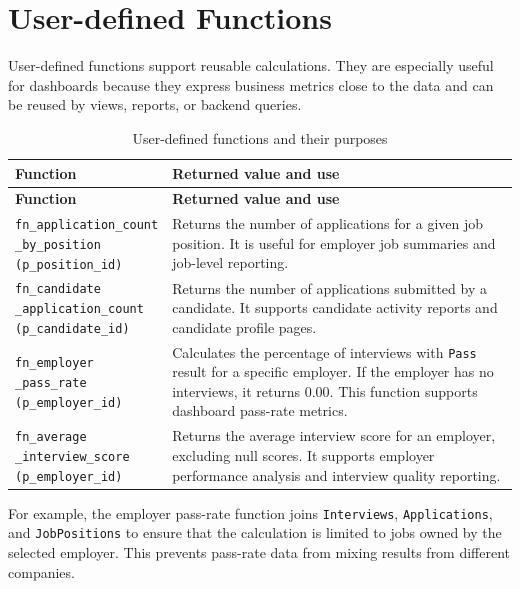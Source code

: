 \documentclass[12pt,a4paper]{report}
\makeatletter
\newcommand{\codebreak}[1]{\begin{tabular}[t]{@{}l@{}}#1\end{tabular}}
\makeatother
\begin{document}
\section{User-defined Functions}

User-defined functions support reusable calculations. They are especially useful for dashboards because they express business metrics close to the data and can be reused by views, reports, or backend queries.

\begin{longtable}{L{0.28\textwidth}L{0.62\textwidth}}
\caption{User-defined functions and their purposes}
\label{tab:functions}\\
\toprule
\textbf{Function} & \textbf{Returned value and use} \\
\midrule
\endfirsthead
\toprule
\textbf{Function} & \textbf{Returned value and use} \\
\midrule
\endhead
\codebreak{\texttt{fn\_application\_count}\\\texttt{\_by\_position}\\\texttt{(p\_position\_id)}} & Returns the number of applications for a given job position. It is useful for employer job summaries and job-level reporting. \\
\codebreak{\texttt{fn\_candidate}\\\texttt{\_application\_count}\\\texttt{(p\_candidate\_id)}} & Returns the number of applications submitted by a candidate. It supports candidate activity reports and candidate profile pages. \\
\codebreak{\texttt{fn\_employer}\\\texttt{\_pass\_rate}\\\texttt{(p\_employer\_id)}} & Calculates the percentage of interviews with \texttt{Pass} result for a specific employer. If the employer has no interviews, it returns 0.00. This function supports dashboard pass-rate metrics. \\
\codebreak{\texttt{fn\_average}\\\texttt{\_interview\_score}\\\texttt{(p\_employer\_id)}} & Returns the average interview score for an employer, excluding null scores. It supports employer performance analysis and interview quality reporting. \\
\bottomrule
\end{longtable}

For example, the employer pass-rate function joins \texttt{Interviews}, \texttt{Applications}, and \texttt{JobPositions} to ensure that the calculation is limited to jobs owned by the selected employer. This prevents pass-rate data from mixing results from different companies.
\end{document}
